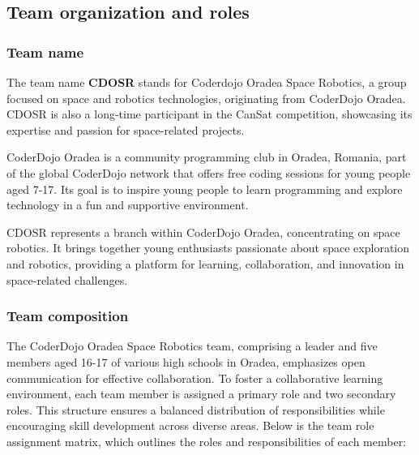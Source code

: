 \subsection{Team organization and roles}

\subsubsection{Team name}
The team name {\textbf{CDOSR}} stands for Coderdojo Oradea Space Robotics, a group focused on space and robotics technologies, originating from CoderDojo Oradea. CDOSR is also a long-time participant in the CanSat competition, showcasing its expertise and passion for space-related projects.

CoderDojo Oradea is a community programming club in Oradea, Romania, part of the global CoderDojo network that offers free coding sessions for young people aged 7-17. Its goal is to inspire young people to learn programming and explore technology in a fun and supportive environment.

CDOSR represents a branch within CoderDojo Oradea, concentrating on space robotics. It brings together young enthusiasts passionate about space exploration and robotics, providing a platform for learning, collaboration, and innovation in space-related challenges.


\subsubsection{Team composition}

The CoderDojo Oradea Space Robotics team, comprising a leader and five members aged 16-17 of various high schools in Oradea, emphasizes open communication for effective collaboration. To foster a collaborative learning environment, each team member is assigned a primary role and two secondary roles. This structure ensures a balanced distribution of responsibilities while encouraging skill development across diverse areas. Below is the team role assignment matrix, which outlines the roles and responsibilities of each member:


